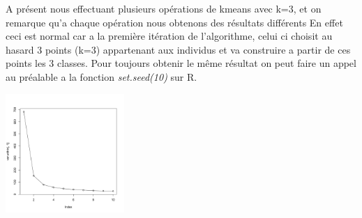 \documentclass[10pt]{article}
\begin{document}
A présent nous effectuant plusieurs opérations de kmeans avec k=3, et on remarque qu'a chaque opération nous obtenons des résultats différents En effet ceci est normal car a la première itération de l'algorithme, celui ci choisit au hasard 3 points (k=3) appartenant aux individus et va construire a partir de ces points les 3 classes. Pour toujours obtenir le même résultat on peut faire un appel  au préalable a la fonction \textit{set.seed(10)} sur R.
	
	
		\begin{center}
		\includegraphics[width=45mm]{Figures/Iris_2/withinvar.png}
		\label{fig:within_vat}
	\end{center}
	
\end{document}
